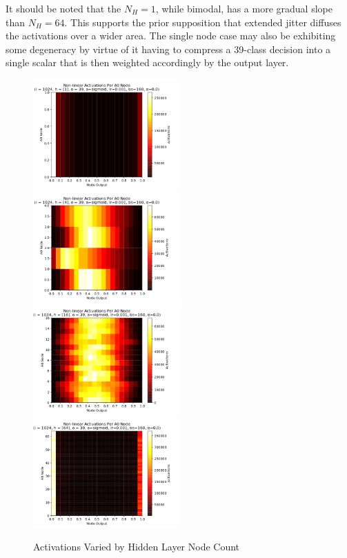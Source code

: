 \documentclass[10pt,epsf]{article}
\begin{document}
{{{      It should be noted that the $N_H = 1$, while bimodal, has a more gradual slope than $N_H = 64$.
      This supports the prior supposition that extended jitter diffuses the activations over a wider
      area. The single node case may also be exhibiting some degeneracy by virtue of it having to compress
      a 39-class decision into a single scalar that is then weighted accordingly by the output layer.
    }
    \begin{figure}[H]
      \includegraphics[width=0.5\textwidth]{./img/1-0.001-160-0-sigmoid-1/activations-A0-255.png}
      \includegraphics[width=0.5\textwidth]{./img/4-0.001-160-0-sigmoid-1/activations-A0-255.png}
      \includegraphics[width=0.5\textwidth]{./img/16-0.001-160-0-sigmoid-1/activations-A0-255.png}
      \includegraphics[width=0.5\textwidth]{./img/64-0.001-160-0-sigmoid-1/activations-A0-255.png}
      \caption{Activations Varied by Hidden Layer Node Count}
      \label{fig:a-by-nh}
    \end{figure}
}}
\end{document}
